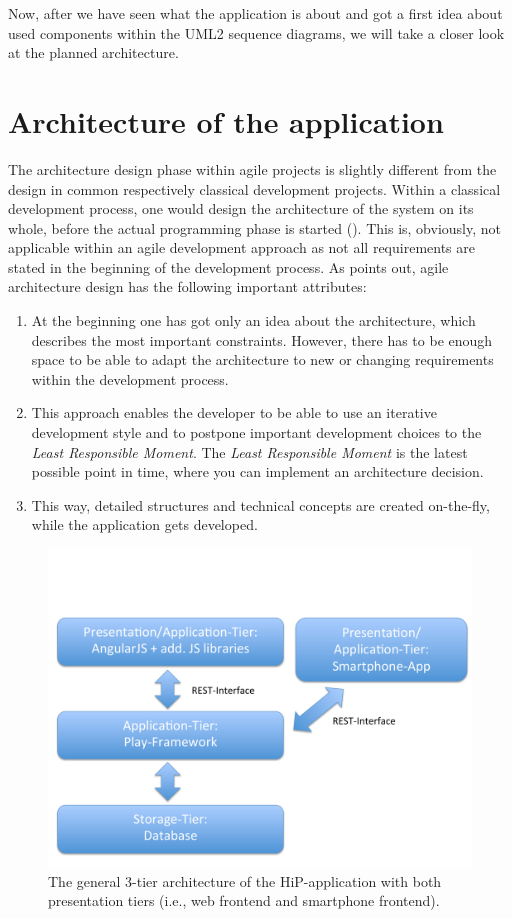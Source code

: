 \clearpage

Now, after we have seen what the application is about and got a first idea about used components within the \ac{UML2} sequence diagrams, we will  take a closer look at the planned architecture.

\section{Architecture of the application}
\label{architecture}
The architecture design phase within agile projects is slightly different from the design in common respectively classical development projects. Within a classical development process, one would design the architecture of the system on its whole, before the actual programming phase is started (\cite{Patterns:2009aa}). This is, obviously, not applicable within an agile development approach as not all requirements are stated in the beginning of the development process. As \cite{Mast2013} points out, agile architecture design has the following important attributes:

\begin{enumerate}
	\item At the beginning one has got only an idea about the architecture, which describes the most important constraints. However, there has to be enough space to be able to adapt the architecture to new or changing requirements within the development process.
	\item This approach enables the developer to be able to use an iterative development style and to postpone important development choices to the \textit{Least Responsible Moment}. The \textit{Least Responsible Moment} is the latest possible point in time, where you can implement an architecture decision.
	\item This way, detailed structures and technical concepts are created on-the-fly, while the application gets developed.
\end{enumerate}

\begin{figure}[th]
\centerline{\includegraphics[width=1\textwidth]{gfx/architecture}}
\caption{The general 3-tier architecture of the HiP-application with both presentation tiers (i.e., web frontend and smartphone frontend).}
\label{hip:architecture}
\end{figure}

